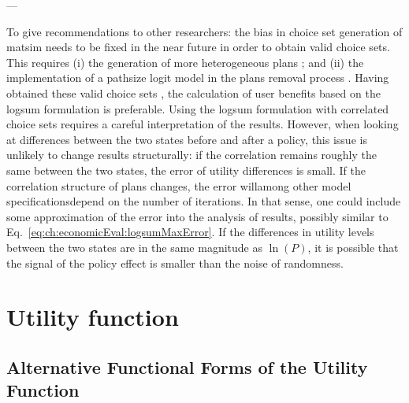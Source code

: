 ---

To give recommendations to other researchers: the bias in choice set generation of \gls{matsim} needs to be fixed in the near future in order to obtain valid choice sets.
%
This requires (i) the generation of more heterogeneous plans \citep[see, e.g.,][for such attempts in the \acrshort{pt} and in the car mode, respectively]{Moyo2013PhD, NagelKickhoeferJoubert2014HeterogeneousVoTsPROCEDIA}; and (ii) the implementation of a pathsize logit model in the plans removal process \citep[see, e.g.,][]{Grether2014PhD}.
%
Having obtained these valid choice sets \citep{NagelFloetteroed2009IatbrResourceInBook}, the calculation of user benefits based on the logsum formulation is preferable.
%
%
Using the logsum formulation with correlated choice sets requires a careful interpretation of the results. However, when looking at differences between the two states before and after a policy, this issue is unlikely to change results structurally: if the correlation remains roughly the same between the two states, the error of utility differences is small. If the correlation structure of plans changes, the error will\textemdash among other model specifications\textemdash depend on the number of iterations.
%
%
In that sense, one could include some approximation of the error into the analysis of results, possibly similar to Eq.~\ref{eq:ch:economicEval:logsumMaxError}. If the differences in utility levels between the two states are in the same magnitude as $\ln(P)$, it is possible that the signal of the policy effect is smaller than the noise of randomness.

\section{Utility function}
\label{sec:future-of-scoring-function}

\subsection{Alternative Functional Forms of the Utility Function}
\label{sec:alternative-functions}

